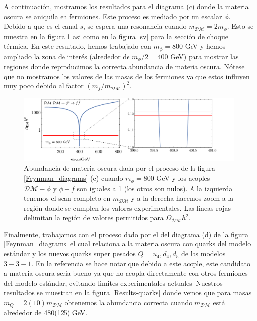 A continuación, mostramos los resultados para el diagrama (c) donde la materia oscura se aniquila en fermiones. Este proceso es mediado por un escalar $\phi$. Debido a que es el canal $s$, se espera una resonancia cuando $m_\mathcal{DM}=2 m_\phi$. Esto se muestra en la figura \ref{Results-fermions} asi como en la figura \ref{sv} para la sección de choque térmica. En este resultado, hemos trabajado con $m_\phi=$800 GeV y hemos ampliado la zona de interés (alrededor de $m_\phi/2 =400$ GeV) para mostrar las regiones donde reproducimos la correcta abundancia de materia oscura. Nótese que no mostramos los valores de las masas de los fermiones ya que estos influyen muy poco debido al factor $(m_f/m_\mathcal{DM})^2$.

\begin{figure}[h]
\centering
\includegraphics[scale=0.6]{Results/fermions.pdf}
\caption[\hspace{0.1in}Abundancia de materia oscura 2]{Abundancia de materia oscura dada por el proceso de la figura \ref{Feynman_diagrams} (c) cuando $m_\phi=800$ GeV y los acoples $\mathcal{DM}-\phi$ y $\phi-f$ son iguales a 1 (los otros son nulos). A la izquierda tenemos el scan completo en $m_\mathcal{DM}$ y a la derecha hacemos zoom a la región donde se cumplen los valores experimentales. Las lineas rojas delimitan la región de valores permitidos para $\Omega_{\mathcal{DM}}h^2$.}
\label{Results-fermions}
\end{figure}


Finalmente, trabajamos con el proceso dado por el del diagrama (d) de la figura \ref{Feynman_diagrams} el cual relaciona a la materia oscura con quarks del modelo estándar y los nuevos quarks super pesados $Q=u_4,d_4,d_5$ de los modelos $3-3-1$. En la referencia \cite{Okada:2016whh} se hace notar que debido a este acople, este candidato a materia oscura seria bueno ya que no acopla directamente con otros fermiones del modelo estándar, evitando limites experimentales actuales. Nuestros resultados se muestran en la figura \ref{Results-quarks} donde vemos que para masas $m_Q=2(10)m_\mathcal{DM}$ obtenemos la abundancia correcta cuando $m_\mathcal{DM}$ está alrededor de 480(125) GeV.


